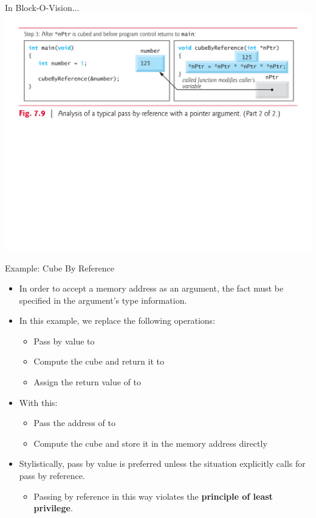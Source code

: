 \documentclass[11pt]{beamer}
\let\OldTexttt\texttt
\renewcommand{\texttt}[1]{\OldTexttt{\color{teal}{#1}}}
\begin{document}
\begin{frame}{In Block-O-Vision...}
\center
\includegraphics[scale=0.35]{tbd.png}
\end{frame}

\begin{frame}[fragile=singleslide]{Example: Cube By Reference}
\begin{itemize}
\item In order to accept a memory address as an argument, the fact must be specified in the argument's type information.
\item In this example, we replace the following operations: 
\begin{itemize}
\item Pass \texttt{num} by value to \texttt{cubeByReference}
\item Compute the cube and return it to \texttt{main}
\item Assign the return value of \texttt{cubeByReference} to \texttt{num}
\end{itemize}
\item With this:
\begin{itemize}
\item Pass the address of \texttt{num} to \texttt{cubeByReference}
\item Compute the cube and store it in the memory address directly
\end{itemize}
\item Stylistically, pass by value is preferred unless the situation explicitly calls for pass by reference.
\begin{itemize}
\item Passing by reference in this way violates the \textbf{principle of least privilege}.
\end{itemize}
\end{itemize}
\end{frame}
\end{document}
